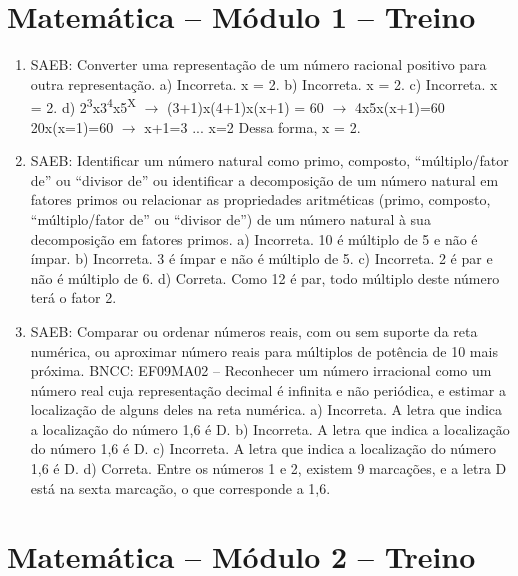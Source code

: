 \pagebreak
\pagestyle{plain}
\footnotesize

\pagecolor{gray!40}

\section*{Matemática – Módulo 1 – Treino}

\begin{enumerate}
\item
SAEB: Converter uma representação de um número 
racional positivo para outra representação.
a) Incorreta. x = 2. 
b) Incorreta. x = 2.
c) Incorreta. x = 2.  
d) 2\textsuperscript{3}x3\textsuperscript{4}x5\textsuperscript{X} $\rightarrow$ 
(3+1)x(4+1)x(x+1) = 60 $\rightarrow$ 4x5x(x+1)=60 
20x(x=1)=60 $\rightarrow$ x+1=3 ... x=2
Dessa forma, x = 2.

\item
SAEB: Identificar um número natural como primo, composto, 
``múltiplo/fator de'' ou ``divisor de'' ou identificar a decomposição de
um número natural em fatores primos ou relacionar as propriedades aritméticas
(primo, composto, ``múltiplo/fator de'' ou ``divisor de'') de um
número natural à sua decomposição em fatores primos.
a) Incorreta. 10 é múltiplo de 5 e não é ímpar.
b) Incorreta. 3 é ímpar e não é múltiplo de 5.
c) Incorreta. 2 é par e não é múltiplo de 6.
d) Correta. Como 12 é par, todo múltiplo deste número terá o fator 2.

\item
SAEB: Comparar ou ordenar números reais, com ou sem suporte da reta
numérica, ou aproximar número reais para múltiplos de potência de 10
mais próxima.
BNCC: EF09MA02 -- Reconhecer um número irracional como um número real cuja representação decimal é infinita e não periódica, e estimar a localização de alguns deles na reta numérica.
a) Incorreta. A letra que indica a localização do número 1,6 é D.
b) Incorreta. A letra que indica a localização do número 1,6 é D.
c) Incorreta. A letra que indica a localização do número 1,6 é D.
d) Correta. Entre os números 1 e 2, existem 9 marcações, e a letra D está
na sexta marcação, o que corresponde a 1,6.
\end{enumerate}

\section*{Matemática – Módulo 2 – Treino}

